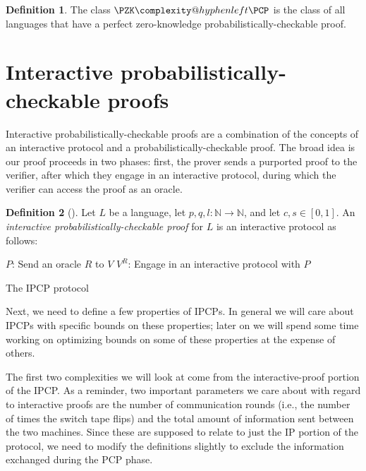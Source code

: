 \documentclass[english,12pt]{reedthesis}
\makeatletter
\theoremstyle{plain}
\theoremstyle{definition}
\newtheorem{defn}[defn]{Definition}
\theoremstyle{remark}
\newcommand{\PZKPCP}{%
  \PZK\complexity@hyphenleft\PCP
}
\makeatother
\begin{document}
\begin{defn}\label{def:pzkpcp-class}\index{PZK-PCP@$\PZKPCP$}
  The class $\PZKPCP$ is the class of all languages that have a perfect
  zero-knowledge probabilistically-checkable proof.
\end{defn}

\section{Interactive probabilistically-checkable proofs}\label{sec:ipcp}

Interactive probabilistically-checkable proofs are a combination of the concepts
of an interactive protocol and a probabilistically-checkable proof. The broad
idea is our proof proceeds in two phases: first, the prover sends a purported
proof to the verifier, after which they engage in an interactive protocol,
during which the verifier can access the proof as an oracle.

\begin{defn}[{\cite[]{KR08}}]\label{def:ipcp}
  Let $L$ be a language, let $p, q, l\colon \mathbb{N} \rightarrow \mathbb{N}$, and let $c, s \in [0, 1]$. An
  \emph{interactive probabilistically-checkable proof} for $L$ is an interactive
  protocol as follows:

  \begin{algorithm}[H]
    $P$: Send an oracle $R$ to $V$\;
    $V^{R}$: Engage in an interactive protocol with $P$\;
    \caption{The IPCP protocol}\label{alg:ipcp-protocol}
  \end{algorithm}
\end{defn}

Next, we need to define a few properties of IPCPs. In general we will care about
IPCPs with specific bounds on these properties; later on we will spend some time
working on optimizing bounds on some of these properties at the expense of
others.

The first two complexities we will look at come from the interactive-proof
portion of the IPCP\@. As a reminder, two important parameters we care about
with regard to interactive proofs are the number of communication rounds (i.e.,
the number of times the switch tape flips) and the total amount of information
sent between the two machines. Since these are supposed to relate to just the IP
portion of the protocol, we need to modify the definitions slightly to exclude
the information exchanged during the PCP phase.
\end{document}
